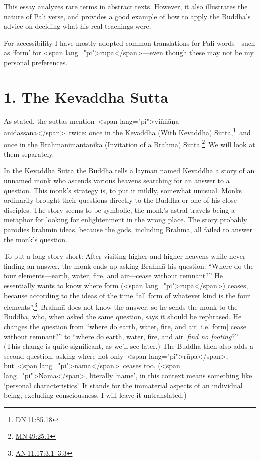 \documentclass[10pt, openright]{book}
\begin{document}
This essay analyzes rare terms in abstract texts. However, it also illustrates the nature of Pali verse, and provides a good example of how to apply the Buddha’s advice on deciding what his real teachings were.


For accessibility I have mostly adopted common translations for Pali words—such as ‘form’ for <span lang="pi">rūpa</span>—even though these may not be my personal preferences.


\chapter{1. The Kevaddha Sutta}
As stated, the suttas mention <span lang="pi">viññāṇa anidassana</span> twice: once in the Kevaddha (With Kevaddha) Sutta,\footnote {\href{https://suttacentral.net/dn11/en/sujato\#85.18}{DN 11:85.18}} and once in the Brahmanimantanika (Invitation of a Brahmā) Sutta.\footnote {\href{https://suttacentral.net/mn49/en/sujato\#25.1}{MN 49:25.1}} We will look at them separately.


In the Kevaddha Sutta the Buddha tells a layman named Kevaddha a story of an unnamed monk who ascends various heavens searching for an answer to a question. This monk’s strategy is, to put it mildly, somewhat unusual. Monks ordinarily brought their questions directly to the Buddha or one of his close disciples. The story seems to be symbolic, the monk’s astral travels being a metaphor for looking for enlightenment in the wrong place. The story probably parodies brahmin ideas, because the gods, including Brahmā, all failed to answer the monk’s question.


To put a long story short: After visiting higher and higher heavens while never finding an answer, the monk ends up asking Brahmā his question: “Where do the four elements—earth, water, fire, and air—cease without remnant?” He essentially wants to know where form (<span lang="pi">rūpa</span>) ceases, because according to the ideas of the time “all form of whatever kind is the four elements”.\footnote {\href{https://suttacentral.net/an11.17/en/sujato\#3.1}{AN 11.17:3.1–3.3}} Brahmā does not know the answer, so he sends the monk to the Buddha, who, when asked the same question, says it should be rephrased. He changes the question from “where do earth, water, fire, and air [i.e. form] cease without remnant?” to “where do earth, water, fire, and air\textit{ find no footing}?” (This change is quite significant, as we’ll see later.) The Buddha then also adds a second question, asking where not only <span lang="pi">rūpa</span>, but <span lang="pi">nāma</span> ceases too. (<span lang="pi">Nāma</span>, literally ‘name’, in this context means something like ‘personal characteristics’. It stands for the immaterial aspects of an individual being, excluding consciousness. I will leave it untranslated.)
\end{document}
